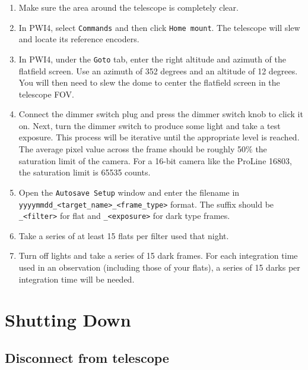 \documentclass{article}
\begin{document}
		\begin{enumerate}

			\item Make sure the area around the telescope is completely clear.

			\item In PWI4, select \texttt{Commands} and then click \texttt{Home mount}. The telescope will slew and locate its reference encoders.

			\item In PWI4, under the \texttt{Goto} tab, enter the right altitude and azimuth of the flatfield screen. Use an azimuth of 352 degrees and an altitude of 12 degrees. You will then need to slew the dome to center the flatfield screen in the telescope FOV.

			\item Connect the dimmer switch plug and press the dimmer switch knob to click it on. Next, turn the dimmer switch to produce some light and take a test exposure. This process will be iterative until the appropriate level is reached. The average pixel value across the frame should be roughly 50\% the saturation limit of the camera. For a 16-bit camera like the ProLine 16803, the saturation limit is 65535 counts.

			\item Open the \texttt{Autosave Setup} window and enter the filename in \texttt{yyyymmdd\_<target\_name>\_<frame\_type>} format. The suffix should be \texttt{\_<filter>} for flat and \texttt{\_<exposure>} for dark type frames.

			\item Take a series of at least 15 flats per filter used that night.

			\item Turn off lights and take a series of 15 dark frames. For each integration time used in an observation (including those of your flats), a series of 15 darks per integration time will be needed.

		\end{enumerate}

	\newpage
	\section{Shutting Down}

	\subsection{Disconnect from telescope}
\end{document}
